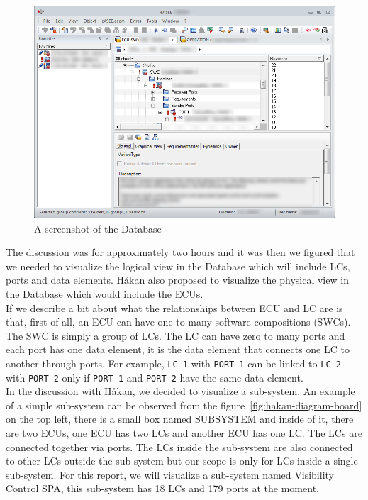 \begin{figure}[H]
\centering
\captionsetup{justification=centering}
\vspace{0cm}%
\includegraphics[width=0.95\linewidth]{figure/misc/elektra_screenshot.png}
\caption{A screenshot of the Database}
\label{fig:screenshot_elektra}
\end{figure}

The discussion was for approximately two hours and it was then we figured that we needed to visualize the logical view in the Database which will include LCs, ports and data elements. Håkan also proposed to visualize the physical view in the Database which would include the ECUs. \\

If we describe a bit about what the relationships between ECU and LC are is that, first of all, an ECU can have one to many software compositions (SWCs). The SWC is simply a group of LCs. The LC can have zero to many ports and each port has one data element, it is the data element that connects one LC to another through ports. For example, \texttt{LC 1} with \texttt{PORT 1} can be linked to \texttt{LC 2} with \texttt{PORT 2} only if \texttt{PORT 1} and \texttt{PORT 2} have the same data element.\\

In the discussion with Håkan, we decided to visualize a sub-system. An example of a simple sub-system can be observed from the figure~\ref{fig:hakan-diagram-board} on the top left, there is a small box named SUBSYSTEM and inside of it, there are two ECUs, one ECU has two LCs and another ECU has one LC. The LCs are connected together via ports. The LCs inside the sub-system are also connected to other LCs outside the sub-system but our scope is only for LCs inside a single sub-system. For this report, we will visualize a sub-system named Visibility Control SPA, this sub-system has 18 LCs and 179 ports at the moment.\\


